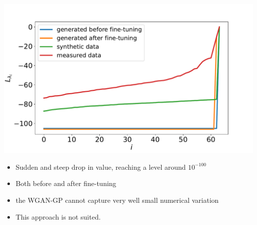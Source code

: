 \documentclass[12pt,pdftex,16x10]{elpres} %
\begin{document}
\begin{psli}
  \begin{minipage}[b][0.7\textheight][t]{0.5\textwidth}
    \centering
    \includegraphics[width=1.2\textwidth]{figs/samples_evals_wgangp.pdf}
  \end{minipage}
  \begin{minipage}[b][0.7\textheight][t]{0.5\textwidth}
    \begin{itemize}
        \item Sudden and steep drop in value, reaching a level around $10^{-100}$
        \item Both before and after fine-tuning
        \item the WGAN-GP cannot capture very well small numerical variation
        \item This approach is not suited.
    \end{itemize}
  \end{minipage}
\end{psli}
\end{document}
